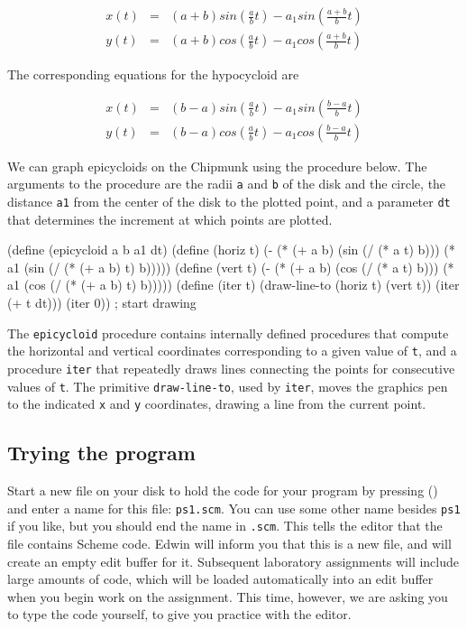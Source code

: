 \[
\begin{array}{lll}
x(t) & = & (a+b) sin (\frac{a}{b} t)  -  a_1 sin (\frac{a+b}{b} t) \\
y(t) & = & (a+b) cos (\frac{a}{b} t)  -  a_1 cos (\frac{a+b}{b} t)
\end{array}
\]

The corresponding equations for the hypocycloid are

\[
\begin{array}{lll}
x(t) & = & (b-a) sin (\frac{a}{b} t)  -  a_1 sin (\frac{b-a}{b} t) \\
y(t) & = & (b-a) cos (\frac{a}{b} t)  -  a_1 cos (\frac{b-a}{b} t)
\end{array}
\]

We can graph epicycloids on the Chipmunk using the procedure
below.  The arguments to the procedure are the radii
{\tt a} and {\tt b} of the disk and the circle, the distance {\tt a1} from
the center of the disk
to the plotted point, and a parameter {\tt dt} that determines the
increment at which points are plotted.

\begin{minipage}[t]{\linewidth}
\beginlisp
(define (epicycloid a b a1 dt)
  (define (horiz t)
    (- (* (+ a b) (sin (/ (* a t) b)))
       (* a1 (sin (/ (* (+ a b) t) b)))))
  (define (vert t)
    (- (* (+ a b) (cos (/ (* a t) b)))
       (* a1 (cos (/ (* (+ a b) t) b)))))
  (define (iter t)
    (draw-line-to (horiz t) (vert t))
    (iter (+ t dt)))
  (iter 0))                            ; start drawing
\endlisp
\end{minipage}

The {\tt epicycloid} procedure contains internally defined
procedures that compute the horizontal and vertical coordinates
corresponding to a given value of {\tt t}, and a procedure {\tt iter}
that repeatedly draws lines connecting the points for
consecutive values of {\tt t}.
The primitive {\tt draw-line-to}, used by {\tt iter}, moves the
graphics pen to the indicated {\tt x} and {\tt y} coordinates, drawing a line
from the current point.


\subsection{Trying the program}

Start a new file on your disk to hold the code for your program by
pressing { (\shift {})} and enter a name for this
file: {\tt ps1.scm}.  You can use some other name besides {\tt ps1} if
you like, but you should end the name in {\tt .scm}.  This tells the
editor that the file contains Scheme code.  Edwin will inform you that
this is a new file, and will create an empty edit buffer for it.
Subsequent laboratory assignments will include large amounts of code,
which will be loaded automatically into an edit buffer when you begin
work on the assignment.  This time, however, we are asking you to type
the code yourself, to give you practice with the editor.

